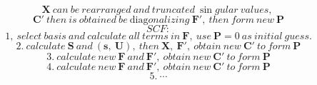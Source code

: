 $$
\mathbf{X\ }can\ be\ rearranged\ and\ truncated\ \sin gular\ values,\ 
$$
$$
\mathbf{C'\ }then\ is\ obtained\ be\ \text{diag}onalizing\ \mathbf{F',\ }then\ form\ new\ \mathbf{P}
$$
$$
SCF:
$$
$$
1,\ select\ basis\ and\ calculate\ all\ terms\ in\ \mathbf{F,\ }use\ \mathbf{P}=0\ as\ initial\ guess.
$$
$$
2.\ calculate\ \mathbf{S\ }and\ \left( \mathbf{s,\ U} \right) ,\ then\ \mathbf{X,\ F',\ }obtain\ new\ \mathbf{C'\ }to\ form\ \mathbf{P}
$$
$$
3.\ calculate\ new\ \mathbf{F\ }and\ \mathbf{F',\ }obtain\ new\ \mathbf{C'\ }to\ form\ \mathbf{P}
$$
$$
4.\ calculate\ new\ \mathbf{F\ }and\ \mathbf{F',\ }obtain\ new\ \mathbf{C'\ }to\ form\ \mathbf{P}
$$
$$
5.\ \cdots 
$$
